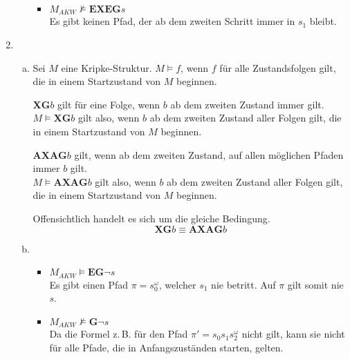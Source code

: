 \documentclass[a4paper]{scrartcl}
\begin{document}
\begin{enumerate}
\begin{enumerate}[(a)]
\begin{itemize}
                    \item $M_{AKW} \not\models \textbf{EXEG}s$ \\
                        Es gibt keinen Pfad, der ab dem zweiten Schritt immer
                        in $s_1$ bleibt.

                \end{itemize}
                
        \end{enumerate}

    \item
        \begin{enumerate}[(a)]
            \item Sei $M$ eine Kripke-Struktur.
                $M \models f$, wenn $f$ für alle Zustandsfolgen gilt, die in
                einem Startzustand von $M$ beginnen.

                $\textbf{XG}b$ gilt für eine Folge, wenn $b$ ab dem zweiten
                Zustand immer gilt. \\
                $M \models \textbf{XG}b$ gilt also, wenn $b$ ab dem zweiten
                Zustand aller Folgen gilt, die in einem Startzustand von $M$
                beginnen.

                $\textbf{AXAG}b$ gilt, wenn ab dem zweiten Zustand, auf allen
                möglichen Pfaden immer $b$ gilt. \\
                $M \models \textbf{AXAG}b$ gilt also, wenn $b$ ab dem zweiten
                Zustand aller Folgen gilt, die in einem Startzustand von $M$
                beginnen.

                Offensichtlich handelt es sich um die gleiche Bedingung.
                \begin{equation*}
                    \textbf{XG}b \equiv \textbf{AXAG}b
                \end{equation*}
                
            \item
                \begin{itemize}
                    \item $M_{AKW} \models \textbf{EG}\lnot s$ \\
                        Es gibt einen Pfad $\pi = s_0^\omega$, welcher $s_1$
                        nie betritt.
                        Auf $\pi$ gilt somit nie $s$.

                    \item $M_{AKW} \not\models \textbf{G}\lnot s$ \\
                        Da die Formel z.\,B. für den Pfad
                        $\pi' = s_0s_1s_2^\omega$ nicht gilt, kann sie nicht für
                        alle Pfade, die in Anfangszuständen starten, gelten.


\end{itemize}
\end{enumerate}
\end{enumerate}
\end{document}
